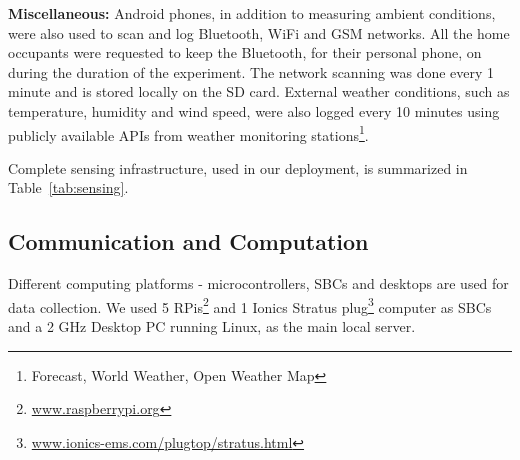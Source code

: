 \documentclass[10pt]{sensys-proc}
\newcommand{\secref}[1]{Section~\ref{#1}}
\newcommand{\tabref}[1]{Table~\ref{#1}}
\begin{document}
\noindent \textbf{Miscellaneous:} Android phones, in addition to measuring ambient conditions, were also used to scan and log Bluetooth, WiFi and GSM networks. All the home occupants were requested to keep the Bluetooth, for their personal phone, on during the duration of the experiment. The network scanning was done every 1 minute and is stored locally on the SD card. External weather conditions, such as temperature, humidity and wind speed, were also logged every 10 minutes using publicly available APIs from weather monitoring stations\footnote{Forecast, World Weather, Open Weather Map}.


Complete sensing infrastructure, used in our deployment, is summarized in \tabref{tab:sensing}.

\subsection{Communication and Computation}
\label{sec:comm_comp}
Different computing platforms - microcontrollers, SBCs and desktops are used for data collection.  
We used 5 RPis\footnote{\url{www.raspberrypi.org}} and 1 Ionics Stratus plug\footnote{\url{www.ionics-ems.com/plugtop/stratus.html}} computer as SBCs and a 2 GHz Desktop PC running Linux, as the main local server.
\end{document}
